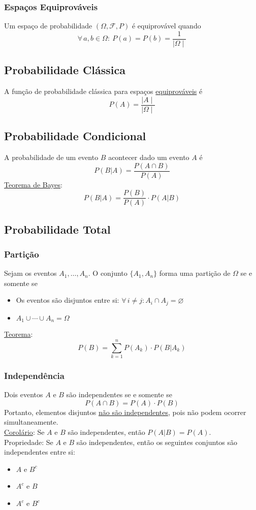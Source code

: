 \documentclass{article}
\begin{document}
\subsubsection{Espaços Equiprováveis}
Um espaço de probabilidade $(\Omega, \mathcal{F}, P)$ é equiprovável quando
\[ \forall \, a, b \in \Omega: \> P({a}) = P({b}) = \frac{1}{\mid \Omega \mid} \]


\subsection{Probabilidade Clássica}
A função de probabilidade clássica para espaços \uline{equiprováveis} é
\[ P(A) = \frac{\mid A \mid}{\mid \Omega \mid} \]


\subsection{Probabilidade Condicional}
A probabilidade de um evento $B$ acontecer dado um evento $A$ é
\[ P(B|A) = \frac{P(A \cap B)}{P(A)} \]
\uline{Teorema de Bayes}:
\[ P(B|A) = \frac{P(B)}{P(A)} \cdot P(A|B) \]


\subsection{Probabilidade Total}

\subsubsection{Partição}
Sejam os eventos $A_1, \hdots, A_n$. O conjunto $\{ A_1, A_n \}$ forma uma partição de $\Omega$ se e somente se
\begin{itemize}
  \item Os eventos são disjuntos entre si: $\forall \, i \neq j: A_i \cap A_j = \varnothing$
  \item $A_1 \cup \cdots \cup A_n = \Omega$
\end{itemize}
\uline{Teorema}:
\[ P(B) = \sum_{k = 1}^{n} P(A_k) \cdot P(B|A_k) \]

\subsubsection{Independência}
Dois eventos $A$ e $B$ são independentes se e somente se
\[ P(A \cap B) = P(A) \cdot P(B) \]
Portanto, elementos disjuntos \uline{não são independentes}, pois não podem ocorrer simultaneamente. \\[10pt]
\uline{Corolário}: Se $A$ e $B$ são independentes, então $P(A|B) = P(A)$. \\[10pt]
Propriedade: Se $A$ e $B$ são independentes, então os seguintes conjuntos são independentes entre si:
\begin{itemize}
  \item $A$ e $B^c$
  \item $A^c$ e $B$
  \item $A^c$ e $B^c$
\end{itemize}
\end{document}
